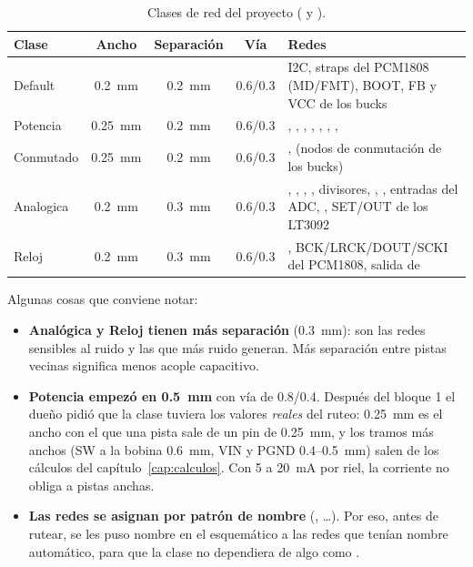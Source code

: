 \begin{table}[htbp]
\centering\small
\caption{Clases de red del proyecto ( y ).}
\label{tab:c06-clases}
\begin{tabularx}{\linewidth}{@{}lcccY@{}}
\toprule
\textbf{Clase} & \textbf{Ancho} & \textbf{Separación} & \textbf{Vía} & \textbf{Redes}\\
\midrule
Default & \SI{0.2}{\milli\meter} & \SI{0.2}{\milli\meter} & 0.6/0.3 & I2C, straps del PCM1808 (MD/FMT), BOOT, FB y VCC de los bucks\\
Potencia & \SI{0.25}{\milli\meter} & \SI{0.2}{\milli\meter} & 0.6/0.3 & , , , ,
  , , , \\
Conmutado & \SI{0.25}{\milli\meter} & \SI{0.2}{\milli\meter} & 0.6/0.3 & ,  (nodos de conmutación de los bucks)\\
Analogica & \SI{0.2}{\milli\meter} & \SI{0.3}{\milli\meter} & 0.6/0.3 & , , , ,
  divisores, , , entradas del ADC, , SET/OUT de los LT3092\\
Reloj & \SI{0.2}{\milli\meter} & \SI{0.3}{\milli\meter} & 0.6/0.3 & , BCK/LRCK/DOUT/SCKI del PCM1808, salida de \\
\bottomrule
\end{tabularx}
\end{table}

Algunas cosas que conviene notar:
\begin{itemize}
  \item \textbf{Analógica y Reloj tienen más separación} (\SI{0.3}{\milli\meter}): son las redes sensibles al ruido y
        las que más ruido generan. Más separación entre pistas vecinas significa menos acople capacitivo.
  \item \textbf{Potencia empezó en \SI{0.5}{\milli\meter}} con vía de 0.8/0.4. Después del bloque 1 el dueño pidió
        que la clase tuviera los valores \emph{reales} del ruteo: \SI{0.25}{\milli\meter} es el ancho con el que una
        pista sale de un pin de \SI{0.25}{\milli\meter}, y los tramos más anchos (SW a la bobina
        \SI{0.6}{\milli\meter}, VIN y PGND 0.4--\SI{0.5}{\milli\meter}) salen de los cálculos del
        capítulo~\ref{cap:calculos}. Con 5 a \SI{20}{\milli\ampere} por riel, la corriente no obliga a pistas anchas.
  \item \textbf{Las redes se asignan por patrón de nombre} (, \dots). Por eso, antes de rutear,
        se les puso nombre en el esquemático a las redes que tenían nombre automático, para que la clase no
        dependiera de algo como .
\end{itemize}

